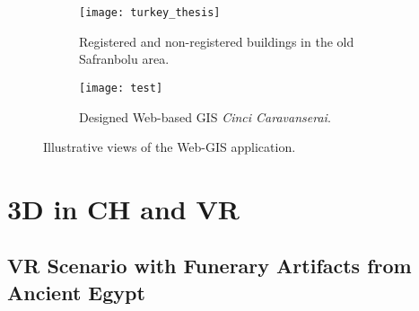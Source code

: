 

\begin{figure}
  \centering
  \begin{subfigure}[b]{0.45\textwidth}
      \centering
      \texttt{[image: turkey\_thesis]}
      \caption{Registered and non-registered buildings in the old Safranbolu area.}
      \label{fig:x}
  \end{subfigure}
  \hfill
  \begin{subfigure}[b]{0.45\textwidth}
      \centering
      \texttt{[image: test]}
      \caption{Designed Web-based \gls{GIS} \textit{Cinci Caravanserai}.}
      \label{fig:y}
  \end{subfigure}
     \caption{Illustrative views of the Web-\gls{GIS} application.}
     \label{fig:z}
\end{figure}









\section{\gls{3D} in \gls{CH} and \gls{VR}}
\label{sec:3d_vr}

\subsection{\gls{VR} Scenario with Funerary Artifacts from Ancient Egypt} 
\label{sec:3d_vr_devices}

